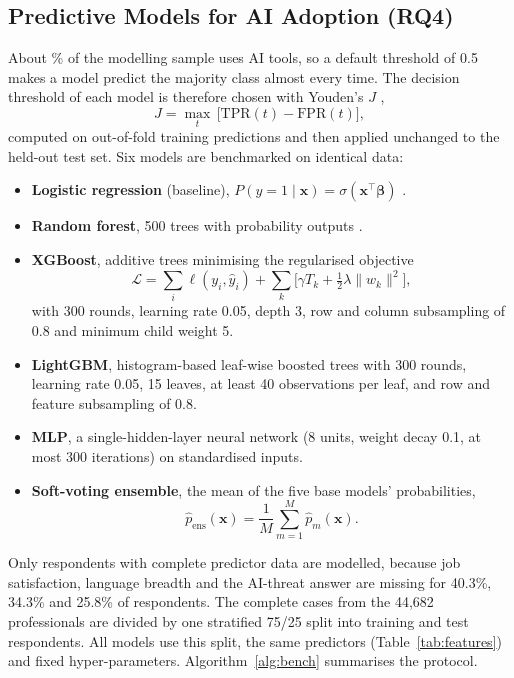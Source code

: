 \documentclass[conference]{IEEEtran}
\begin{document}
\subsection{Predictive Models for AI Adoption (RQ4)}
About \posShare\% of the modelling sample uses AI tools, so a default threshold of 0.5 makes a model predict the majority class almost every time. The decision threshold of each model is therefore chosen with Youden's $J$ \cite{youden1950},
\begin{equation}
J=\max_t\,\bigl[\mathrm{TPR}(t)-\mathrm{FPR}(t)\bigr],
\end{equation}
computed on out-of-fold training predictions and then applied unchanged to the held-out test set. Six models are benchmarked on identical data:
\begin{itemize}
\item \textbf{Logistic regression} (baseline), $P(y{=}1\mid\mathbf{x})=\sigma(\mathbf{x}^\top\boldsymbol\beta)$ \cite{hosmer2013}.
\item \textbf{Random forest}, 500 trees with probability outputs \cite{breiman2001,wright2017}.
\item \textbf{XGBoost}, additive trees minimising the regularised objective \cite{chen2016}
\begin{equation}
\mathcal{L}=\sum_i \ell(y_i,\hat y_i)+\sum_k\bigl[\gamma T_k+\tfrac12\lambda\lVert w_k\rVert^2\bigr],
\end{equation}
with 300 rounds, learning rate 0.05, depth 3, row and column subsampling of 0.8 and minimum child weight 5.
\item \textbf{LightGBM}, histogram-based leaf-wise boosted trees \cite{ke2017} with 300 rounds, learning rate 0.05, 15 leaves, at least 40 observations per leaf, and row and feature subsampling of 0.8.
\item \textbf{MLP}, a single-hidden-layer neural network \cite{venables2002} (8 units, weight decay 0.1, at most 300 iterations) on standardised inputs.
\item \textbf{Soft-voting ensemble}, the mean of the five base models' probabilities,
\begin{equation}
\hat p_{\text{ens}}(\mathbf{x})=\frac1M\sum_{m=1}^{M}\hat p_m(\mathbf{x}).
\end{equation}
\end{itemize}
Only respondents with complete predictor data are modelled, because job satisfaction, language breadth and the AI-threat answer are missing for 40.3\%, 34.3\% and 25.8\% of respondents. The complete cases from the 44{,}682 professionals are divided by one stratified 75/25 split into \nTrain{} training and \nTest{} test respondents. All models use this split, the same predictors (Table~\ref{tab:features}) and fixed hyper-parameters. Algorithm~\ref{alg:bench} summarises the protocol.
\end{document}
